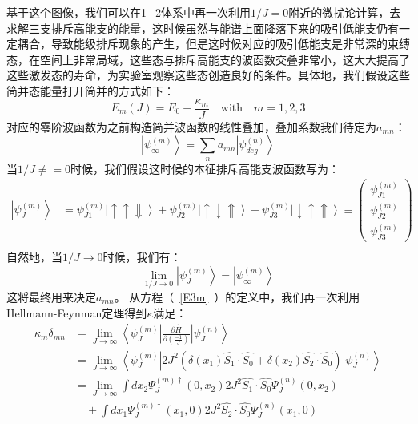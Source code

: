 基于这个图像，我们可以在1+2体系中再一次利用$1/J=0$附近的微扰论计算，去求解三支排斥高能支的能量，这时候虽然与能谱上面降落下来的吸引低能支仍有一定耦合，导致能级排斥现象的产生，但是这时候对应的吸引低能支是非常深的束缚态，在空间上非常局域，这些态与排斥高能支的波函数交叠非常小，这大大提高了这些激发态的寿命，为实验室观察这些态创造良好的条件。具体地，我们假设这些简并态能量打开简并的方式如下：
\begin{equation}
    E_m(J) = E_0 - \frac{\kappa_m }{J} \quad \text{with}  \quad m =1,2,3  \label{E3m}
\end{equation}
对应的零阶波函数为之前构造简并波函数的线性叠加，叠加系数我们待定为$a_{mn}$：
    \begin{equation}
        \left|\psi^{(m)}_{\infty} \right> = \sum_n a_{mn} \left|\psi^{(n)}_{deg}\right>
    \end{equation}
当$1/J\neq=0$时候，我们假设这时候的本征排斥高能支波函数写为：
    \begin{equation}
        \begin{split}
            \left|\psi^{(m)}_J\right> &=  \psi^{(m)}_{J1}\left|\uparrow \uparrow \Downarrow \right> + \psi^{(m)}_{J2} \left|\uparrow \downarrow \Uparrow \right>  +\psi^{(m)}_{J3} \left|\downarrow \uparrow \Uparrow \right> \equiv\left(
            \begin{array}{c}
                \psi_{J1}^{(m)} \\
                \psi_{J2}^{(m)}\\
                \psi_{J3}^{(m)}
            \end{array}
            \right)\\
        \end{split} \label{eq2}
    \end{equation} 
自然地，当$1/J\to0$时候，我们有：
\begin{equation}\label{infcond}
    \lim_{1/J\to0} \left|\psi^{(m)}_J\right>  = \left|\psi^{(m)}_{\infty} \right>
\end{equation}
这将最终用来决定$a_{mn}$。
从方程（~\ref{E3m}~）的定义中，我们再一次利用Hellmann-Feynman定理得到$\kappa$满足：
    \begin{equation}
        \begin{split}
            \kappa_m \delta_{mn} &= \lim_{J\to \infty} \left<\psi^{(m)}_J\right| \frac{\partial\hat{H}}{\partial(\frac{-1}{J})} \left|\psi^{(n)}_{J}\right>\\
                &= \lim_{J\to \infty} \left<\psi^{(m)}_J\right| 2J^2(\delta(x_1)\hat{S_1}\cdot \hat{S_0}+\delta(x_2)\hat{S_2}\cdot \hat{S_0}) \left|\psi^{(n)}_{J}\right>\\
                &= \lim_{J\to \infty} \int  dx_2 \Psi^{(m)\dagger}_J(0,x_2) 2J^2 \hat{S_1}\cdot \hat{S_0} \Psi^{(n)}_J(0,x_2) \\
                &\quad + \int dx_1 \Psi^{(m)\dagger}_J(x_1,0) 2J^2 \hat{S_2}\cdot \hat{S_0} \Psi^{(n)}_J(x_1,0) \\
        \end{split} \label{kappam}
    \end{equation}
